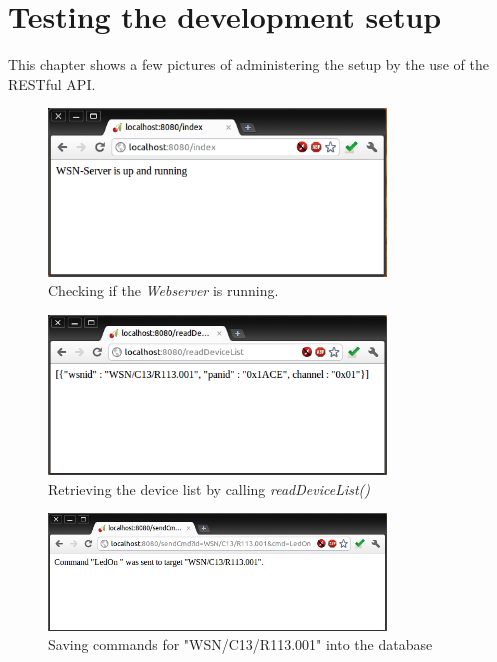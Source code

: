 \newpage
\section{Testing the development setup}
This chapter shows a few pictures of administering the setup by the use of the RESTful API.

\begin{figure}[H]
   \centering
   \includegraphics[width=0.8\textwidth]{pic/Web-server-index.png}%
   \caption{Checking if the \textit{Webserver} is running.}
   \label{web-server-indexpic}%
\end{figure}

\begin{figure}[H]
   \centering
   \includegraphics[width=0.8\textwidth]{pic/Web-server-readDeviceList.png}%
   \caption{Retrieving the device list by calling \textit{readDeviceList()}}
   \label{web-server-readdevicelist-pic}%
\end{figure}

\begin{figure}[H]
   \centering
   \includegraphics[width=0.8\textwidth]{pic/Web-server-sendCMD.png}%
   \caption{Saving commands for "WSN/C13/R113.001" into the database}
   \label{web-server-readdevicelist-pic}%
\end{figure}

